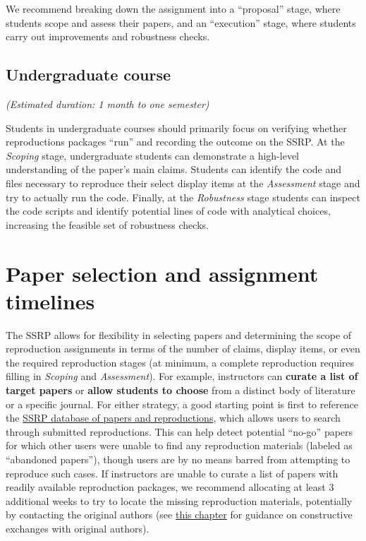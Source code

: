 \documentclass[
]{book}
\begin{document}
We recommend breaking down the assignment into a ``proposal'' stage, where students scope and assess their papers, and an ``execution'' stage, where students carry out improvements and robustness checks.

\hypertarget{undergraduate-course}{%
\subsection{Undergraduate course}\label{undergraduate-course}}

\emph{(Estimated duration: 1 month to one semester)}

Students in undergraduate courses should primarily focus on verifying whether reproductions packages ``run'' and recording the outcome on the SSRP. At the \emph{Scoping} stage, undergraduate students can demonstrate a high-level understanding of the paper's main claims. Students can identify the code and files necessary to reproduce their select display items at the \emph{Assessment} stage and try to actually run the code. Finally, at the \emph{Robustness} stage students can inspect the code scripts and identify potential lines of code with analytical choices, increasing the feasible set of robustness checks.

\hypertarget{paper-selection-and-assignment-timelines}{%
\section{Paper selection and assignment timelines}\label{paper-selection-and-assignment-timelines}}

The SSRP allows for flexibility in selecting papers and determining the scope of reproduction assignments in terms of the number of claims, display items, or even the required reproduction stages (at minimum, a complete reproduction requires filling in \emph{Scoping} and \emph{Assessment}). For example, instructors can \textbf{curate a list of target papers} or \textbf{allow students to choose} from a distinct body of literature or a specific journal. For either strategy, a good starting point is first to reference the \href{https://www.socialsciencereproduction.org/reproductions/search}{SSRP database of papers and reproductions}, which allows users to search through submitted reproductions. This can help detect potential ``no-go'' papers for which other users were unable to find any reproduction materials (labeled as ``abandoned papers''), though users are by no means barred from attempting to reproduce such cases. If instructors are unable to curate a list of papers with readily available reproduction packages, we recommend allocating at least 3 additional weeks to try to locate the missing reproduction materials, potentially by contacting the original authors (see \href{https://bitss.github.io/ACRE/comunications.html\#comunications}{this chapter} for guidance on constructive exchanges with original authors).
\end{document}
